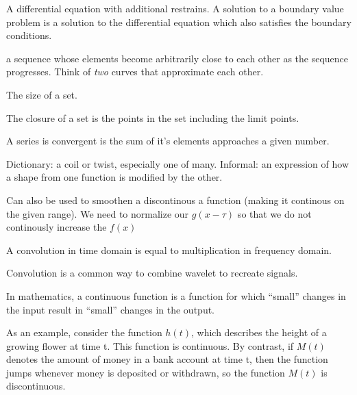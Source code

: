 \begin{definition}
    A differential equation with additional restrains. A solution to a boundary
    value problem is a solution to the differential equation which also
    satisfies the boundary conditions.
    
\end{definition}


\begin{definition}
    a sequence whose elements become arbitrarily close to each other as the
    sequence progresses.
    Think of \textit{two} curves that approximate each other.

\end{definition}

\begin{definition}
    The size of a set.
\end{definition}

\begin{definition}[Closure]
    The closure of a set is the points in the set including the limit points.
\end{definition}

\begin{definition}[Convergence]\label{convergence}
    A series is convergent is the sum of it's elements approaches a given 
    number.
\end{definition}

\begin{definition}[Convolution]
    Dictionary: a coil or twist, especially one of many.\newline
    Informal: an expression of how a shape from one function is modified by 
        the other.

    Can also be used to smoothen a discontinous a function (making it continous 
    on the given range). We need to normalize our $g(x - \tau)$ so that we do
    not continously increase the $f(x)$

    A convolution in time domain is equal to multiplication in frequency domain.

    Convolution is a common way to combine wavelet to recreate signals.
\end{definition}

\begin{definition}[Continuous]
In mathematics, a continuous function is a function for which
``small'' changes in the input result in ``small'' changes in the output.

As an example, consider the function $h(t)$, which describes the height of a
growing flower at time t. This function is continuous. By contrast, if $M(t)$
denotes the amount of money in a bank account at time t, then the function
jumps whenever money is deposited or withdrawn, so the function $M(t)$ is
discontinuous.

\end{definition}

